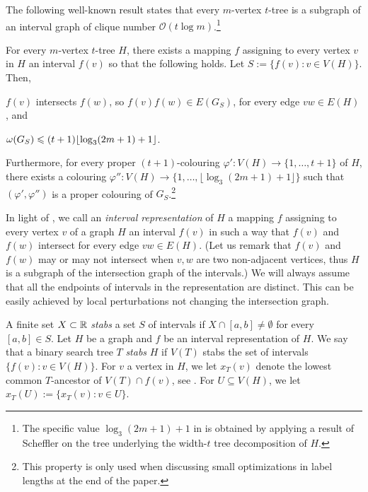 \documentclass[kpfonts]{patmorin}
\newcommand{\Oh}{\mathcal{O}}
\let\leq\leqslant
\begin{document}
The following well-known result states that every $m$-vertex $t$-tree is a subgraph of an interval graph of clique number $\Oh(t\log m)$.\footnote{The specific value $\log_3(2m+1) + 1$ in  is obtained by applying a result of Scheffler \cite{scheffler:optimal} on the tree underlying the width-$t$ tree decomposition of $H$.}

\begin{lem}
  For every $m$-vertex $t$-tree $H$, there exists a mapping $f$ assigning to every vertex $v$ in $H$ an interval $f(v)$ so that the following holds. Let $S:=\{f(v):v\in V(H)\}$. Then,
\begin{compactenum}
  \item $f(v)$ intersects $f(w)$, so $f(v)f(w)\in E(G_S)$, for every edge $vw\in E(H)$, and 
  \item $\omega(G_S) \leq (t+1)\floor{\log_3(2m+1)+1}$.
\end{compactenum}
Furthermore, for every proper $(t+1)$-colouring $\varphi':V(H)\to\{1,\dots,t+1\}$ of $H$, there exists a colouring $\varphi'':V(H)\to\{1,\dots,\lfloor\log_3(2m+1)+1\rfloor\}$ such that $(\varphi',\varphi'')$ is a proper colouring of $G_S$.\footnote{This property is only used when discussing small optimizations in label lengths at the end of the paper.}  
\end{lem}

In light of , we call an \emph{interval representation} of $H$ 
a mapping $f$ assigning to every vertex $v$ of a graph $H$ an interval $f(v)$ in such a way that $f(v)$ and $f(w)$ intersect for every edge $vw\in E(H)$. 
(Let us remark that $f(v)$ and $f(w)$ may or may not intersect when $v,w$ are two non-adjacent vertices, thus $H$ is a subgraph of the intersection graph of the intervals.) 
We will always assume that all the endpoints of intervals in the representation are distinct. 
This can be easily achieved by local perturbations not changing the intersection graph.

A finite set $X\subset\mathbb{R}$ \emph{stabs} a set $S$ of intervals if $X\cap [a,b]\neq\emptyset$ for every $[a,b]\in S$.
Let $H$ be a graph and $f$ be an interval representation of $H$. 
We say that a binary search tree $T$ \emph{stabs} $H$ if $V(T)$ stabs the set of intervals $\{f(v):v\in V(H)\}$. 
For $v$ a vertex in $H$, we let $x_T(v)$ denote the lowest common $T$-ancestor of $V(T)\cap f(v)$, see .
For $U \subseteq V(H)$, we let $x_T(U):=\{x_T(v):v\in U\}$.
\end{document}
